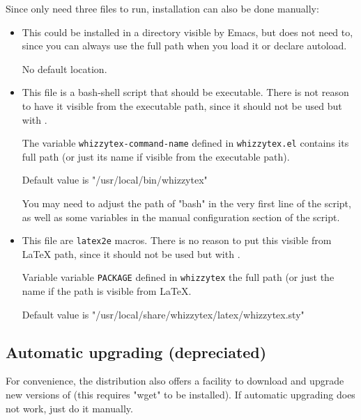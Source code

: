 \documentclass[12pt]{article}
\begin{document}
Since {\whizzy} only need three files to run, installation can also be done
manually:
\begin {itemize}

\item[]\hspace{-2em}{\tt whizzytex.el}

This could be installed in a directory visible by Emacs, but does not need
to, since you can always use the full path when you load it or declare
autoload. 

No default location.

\item[]\hspace {-2em}{\tt whizzytex}

This file is a bash-shell script that should be executable.  There is not
reason to have it visible from the executable path, since it should not be
used but with {\whizzy}.

The variable {\tt whizzytex-command-name} defined in {\tt whizzytex.el} 
contains its full path (or just its name if visible from the executable
path). 

Default value is \lst"/usr/local/bin/whizzytex"

You may  need to adjust the path of \lst"bash" in the very first line of the
script, as well as some variables in the manual configuration section of the
script. 

\item[]\hspace{-2em}{\tt whizzytex.sty}

This file are {\tt latex2e} macros. There is no reason to put this visible
from {\LaTeX} path, since it should not be used but with {\whizzy}.

Variable variable {\tt PACKAGE} defined in {\tt whizzytex} 
the full path (or just the name if the path is visible from {\LaTeX}. 

Default value is \lst"/usr/local/share/whizzytex/latex/whizzytex.sty"

\end {itemize}


\subsection {Automatic upgrading (depreciated)}

For convenience, the distribution also offers a facility to download and
upgrade new versions of {\whizzy} (this requires \lst"wget" to be
installed).  If automatic upgrading does not work, just do it manually.
\end{document}
